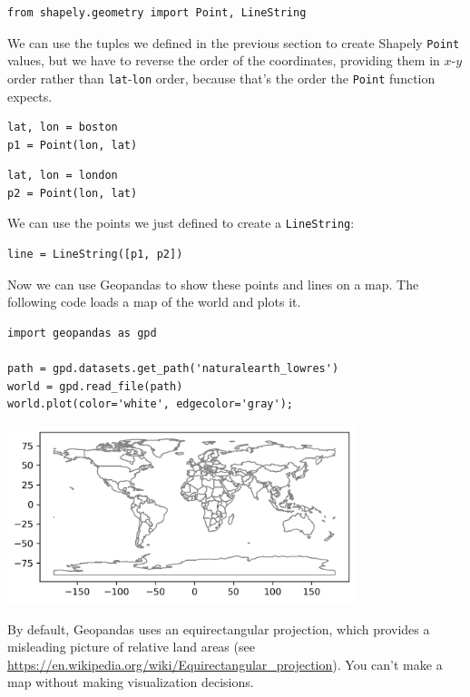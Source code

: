 \begin{lstlisting}[]
from shapely.geometry import Point, LineString
\end{lstlisting}

We can use the tuples we defined in the previous section to create
Shapely \passthrough{\lstinline!Point!} values, but we have to reverse
the order of the coordinates, providing them in \(x\)-\(y\) order rather
than \passthrough{\lstinline!lat!}-\passthrough{\lstinline!lon!} order,
because that's the order the \passthrough{\lstinline!Point!} function
expects.

\begin{lstlisting}[]
lat, lon = boston
p1 = Point(lon, lat)
\end{lstlisting}

\begin{lstlisting}[]
lat, lon = london
p2 = Point(lon, lat)
\end{lstlisting}

We can use the points we just defined to create a
\passthrough{\lstinline!LineString!}:

\begin{lstlisting}[]
line = LineString([p1, p2])
\end{lstlisting}

Now we can use Geopandas to show these points and lines on a map. The
following code loads a map of the world and plots it.

\begin{lstlisting}[]
import geopandas as gpd

path = gpd.datasets.get_path('naturalearth_lowres')
world = gpd.read_file(path)
world.plot(color='white', edgecolor='gray');
\end{lstlisting}

\begin{center}
\includegraphics[width=4in]{02_times_files/02_times_122_0.png}
\end{center}

By default, Geopandas uses an equirectangular projection, which provides
a misleading picture of relative land areas (see
\url{https://en.wikipedia.org/wiki/Equirectangular_projection}). You
can't make a map without making visualization decisions.

